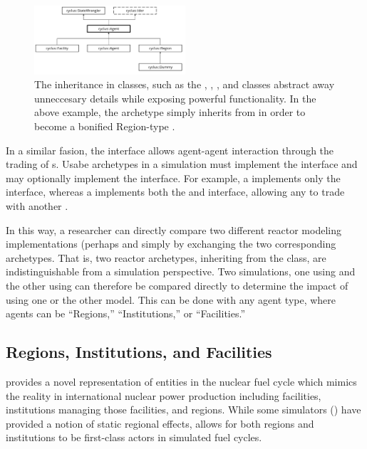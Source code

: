 \begin{figure}[htbp!]
\begin{center}
\includegraphics[width=0.5\textwidth]{./images/agent_uml}
\end{center}
\caption{The inheritance in \Cyclus classes, such as the , 
, , and  classes abstract away 
unneccesary details while exposing powerful functionality. In the above 
example, the  archetype simply inherits from  in 
order to become a bonified Region-type .}
\label{fig:agent_uml}
\end{figure}

In a similar fasion, the  interface allows agent-agent interaction through the
trading of s. Usabe archetypes in a \Cyclus simulation must
implement the  interface and may optionally implement the
 interface. For example, a  implements only the
 interface, whereas a  implements both the
 and  interface, allowing any  to
trade with another .

In this way, a researcher can directly compare two different reactor modeling 
implementations (perhaps  and  
simply by exchanging the two corresponding archetypes. That is, two reactor 
archetypes, inheriting from the  class, are indistinguishable 
from a simulation perspective. Two simulations, one using 
 and the other using  can therefore 
be compared directly to determine the impact of using one or the other model.
This can be done with any agent type, where agents can be ``Regions,'' 
``Institutions,'' or ``Facilities.''

\subsection{Regions, Institutions, and Facilities}

\Cyclus provides a novel representation of entities in the nuclear fuel cycle 
which mimics the reality in international nuclear power production
including facilities, institutions managing those facilities, and regions. While
some simulators () have provided a notion of static regional
effects, \Cyclus allows for both regions and institutions to be first-class
actors in simulated fuel cycles.

